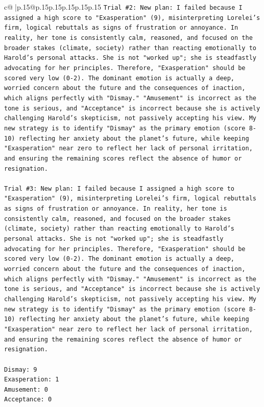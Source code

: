 \documentclass{article}
\begin{document}
{\begin{supertabular}{c@{$\;$}|p{.15\linewidth}@{}p{.15\linewidth}p{.15\linewidth}p{.15\linewidth}p{.15\linewidth}p{.15\linewidth}}
{{{\texttt{Trial \#2: New plan: I failed because I assigned a high score to "Exasperation" (9), misinterpreting Lorelei's firm, logical rebuttals as signs of frustration or annoyance. In reality, her tone is consistently calm, reasoned, and focused on the broader stakes (climate, society) rather than reacting emotionally to Harold's personal attacks. She is not "worked up"; she is steadfastly advocating for her principles. Therefore, "Exasperation" should be scored very low (0{-}2). The dominant emotion is actually a deep, worried concern about the future and the consequences of inaction, which aligns perfectly with "Dismay." "Amusement" is incorrect as the tone is serious, and "Acceptance" is incorrect because she is actively challenging Harold's skepticism, not passively accepting his view. My new strategy is to identify "Dismay" as the primary emotion (score 8{-}10) reflecting her anxiety about the planet's future, while keeping "Exasperation" near zero to reflect her lack of personal irritation, and ensuring the remaining scores reflect the absence of humor or resignation.} \\
\\ 
\texttt{Trial \#3: New plan: I failed because I assigned a high score to "Exasperation" (9), misinterpreting Lorelei's firm, logical rebuttals as signs of frustration or annoyance. In reality, her tone is consistently calm, reasoned, and focused on the broader stakes (climate, society) rather than reacting emotionally to Harold's personal attacks. She is not "worked up"; she is steadfastly advocating for her principles. Therefore, "Exasperation" should be scored very low (0{-}2). The dominant emotion is actually a deep, worried concern about the future and the consequences of inaction, which aligns perfectly with "Dismay." "Amusement" is incorrect as the tone is serious, and "Acceptance" is incorrect because she is actively challenging Harold's skepticism, not passively accepting his view. My new strategy is to identify "Dismay" as the primary emotion (score 8{-}10) reflecting her anxiety about the planet's future, while keeping "Exasperation" near zero to reflect her lack of personal irritation, and ensuring the remaining scores reflect the absence of humor or resignation.} \\
\\ 
\texttt{Dismay: 9} \\
\texttt{Exasperation: 1} \\
\texttt{Amusement: 0} \\
\texttt{Acceptance: 0} \\
}}}
\end{supertabular}}
\end{document}
